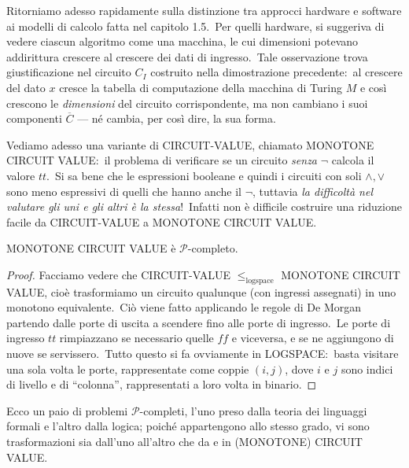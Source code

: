 \noindent Ritorniamo adesso rapidamente sulla distinzione tra approcci hardware e software ai modelli di calcolo fatta nel capitolo 1.5.\
Per quelli hardware, si suggeriva di vedere ciascun algoritmo come una macchina, le cui dimensioni potevano addirittura crescere al crescere dei dati di ingresso.\
Tale osservazione trova giustificazione nel circuito $C_I$ costruito nella dimostrazione precedente:\ al crescere del dato $x$ cresce la tabella di computazione della macchina di Turing $M$ e così crescono le \textit{dimensioni} del circuito corrispondente, ma non cambiano i suoi componenti $\overline{C}$ --- né cambia, per così dire, la sua forma.\

\medskip
\noindent Vediamo adesso una variante di {\footnotesize CIRCUIT-VALUE}, chiamato {\footnotesize MONOTONE CIRCUIT VALUE}:\ il problema di verificare se un circuito \textit{senza} $\neg$ calcola il valore $tt$.\
Si sa bene che le espressioni booleane e quindi i circuiti con soli $\land, \lor$ sono meno espressivi di quelli che hanno anche il $\neg$, tuttavia \textit{la difficoltà nel valutare gli uni e gli altri è la stessa}!\
Infatti non è difficile costruire una riduzione facile da {\footnotesize CIRCUIT-VALUE} a {\footnotesize MONOTONE CIRCUIT VALUE}.\

\begin{corollario}
    {\footnotesize MONOTONE CIRCUIT VALUE} è $\mathcal{P}$-completo.
\end{corollario}

\begin{proof}

    Facciamo vedere che {\footnotesize CIRCUIT-VALUE} $\leqslant_{\mathrm{logspace}}$ {\footnotesize MONOTONE CIRCUIT VALUE}, cioè trasformiamo un circuito qualunque (con ingressi assegnati) in uno monotono equivalente.\
    Ciò viene fatto applicando le regole di De Morgan partendo dalle porte di uscita a scendere fino alle porte di ingresso.\
    Le porte di ingresso $\mathit{tt}$ rimpiazzano se necessario quelle $\mathit{ff}$ e viceversa, e se ne aggiungono di nuove se servissero.\
    Tutto questo si fa ovviamente in LOGSPACE:\ basta visitare una sola volta le porte, rappresentate come coppie $(i, j)$, dove $i$ e $j$ sono indici di livello e di ``colonna'', rappresentati a loro volta in binario.

\end{proof}

\noindent Ecco un paio di problemi $\mathcal{P}$-completi, l'uno preso dalla teoria dei linguaggi formali e l'altro dalla logica; poiché appartengono allo stesso grado, vi sono trasformazioni sia dall'uno all'altro che da e in ({\footnotesize MONOTONE}) {\footnotesize CIRCUIT VALUE}.

